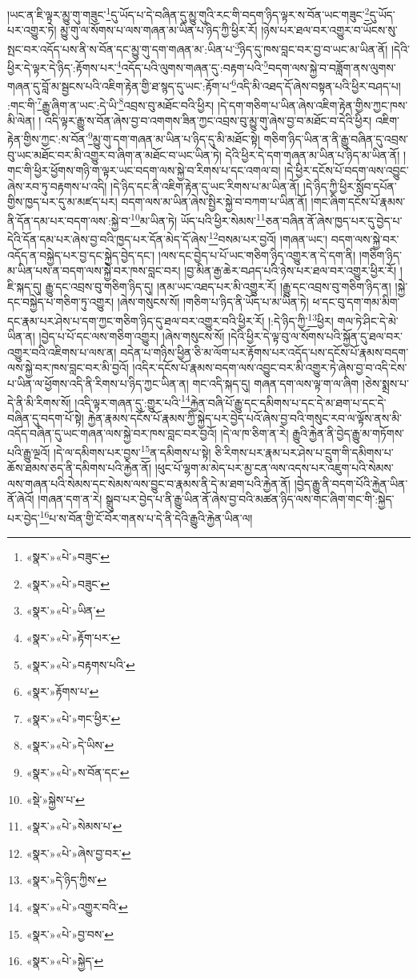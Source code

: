 །ཡང་ན་ཇི་ལྟར་མྱུ་གུ་གཟུང་\footnote{«སྣར་»«པེ་»བཟུང་}དུ་ཡོད་པ་དེ་བཞིན་དུ་མྱུ་གུའི་རང་གི་བདག་ཉིད་ལྟར་ས་བོན་ཡང་གཟུང་\footnote{«སྣར་»«པེ་»བཟུང་}དུ་ཡོད་པར་འགྱུར་ཏེ། མྱུ་གུ་ལ་སོགས་པ་ལས་གཞན་མ་ཡིན་པ་ཉིད་ཀྱི་ཕྱིར་རོ། །ཉེས་པར་ཐལ་བར་འགྱུར་བ་ཡོངས་སུ་སྤང་བར་འདོད་པས་ནི་ས་བོན་དང་མྱུ་གུ་དག་གཞན་མ་:ཡིན་པ་\footnote{«སྣར་»«པེ་»ཡིན་}ཉིད་དུ་ཁས་བླང་བར་བྱ་བ་ཡང་མ་ཡིན་ནོ། །དེའི་ཕྱིར་དེ་ལྟར་དེ་ཉིད་:རྟོགས་པར་\footnote{«སྣར་»«པེ་»རྟོག་པར་}འདོད་པའི་ལུགས་གཞན་དུ་:བརྟག་པའི་\footnote{«སྣར་»«པེ་»བརྟགས་པའི་}བདག་ལས་སྐྱེ་བ་བཟློག་ནས་ལུགས་གཞན་དུ་བློ་མ་སྦྱངས་པའི་འཇིག་རྟེན་གྱི་ཐ་སྙད་དུ་ཡང་:རྟོག་པ་\footnote{«སྣར་»རྟོགས་པ་}འདི་མི་འཐད་དོ་ཞེས་བསྟན་པའི་ཕྱིར་བཤད་པ། :གང་གི་\footnote{«སྣར་»«པེ་»གང་ཕྱིར་}རྒྱུ་ཞིག་ན་ཡང་:དེ་ཡི་\footnote{«སྣར་»«པེ་»དེ་ཡིས་}འབྲས་བུ་མཐོང་བའི་ཕྱིར། །དེ་དག་གཅིག་པ་ཡིན་ཞེས་འཇིག་རྟེན་གྱིས་ཀྱང་ཁས་མི་ལེན། །
འདི་ལྟར་རྒྱུ་ས་བོན་ཞེས་བྱ་བ་འགགས་ཟིན་ཀྱང་འབྲས་བུ་མྱུ་གུ་ཞེས་བྱ་བ་མཐོང་བ་དེའི་ཕྱིར། འཇིག་རྟེན་གྱིས་ཀྱང་:ས་བོན་\footnote{«སྣར་»«པེ་»ས་བོན་དང་}མྱུ་གུ་དག་གཞན་མ་ཡིན་པ་ཉིད་དུ་མི་མཐོང་སྟེ། གཅིག་ཉིད་ཡིན་ན་ནི་རྒྱུ་བཞིན་དུ་འབྲས་བུ་ཡང་མཐོང་བར་མི་འགྱུར་བ་ཞིག་ན་མཐོང་བ་ཡང་ཡིན་ཏེ། དེའི་ཕྱིར་དེ་དག་གཞན་མ་ཡིན་པ་ཉིད་མ་ཡིན་ནོ། །གང་གི་ཕྱིར་ཕྱོགས་གཉི་ག་ལྟར་ཡང་བདག་ལས་སྐྱེ་བ་རིགས་པ་དང་འགལ་བ། །དེ་ཕྱིར་དངོས་པོ་བདག་ལས་འབྱུང་ཞེས་རབ་ཏུ་བརྟགས་པ་འདི། །དེ་ཉིད་དང་ནི་འཇིག་རྟེན་དུ་ཡང་རིགས་པ་མ་ཡིན་ནོ། །དེ་ཉིད་ཀྱི་ཕྱིར་སློབ་དཔོན་གྱིས་ཁྱད་པར་དུ་མ་མཛད་པར། བདག་ལས་མ་ཡིན་ཞེས་སྤྱིར་སྐྱེ་བ་བཀག་པ་ཡིན་ནོ། །གང་ཞིག་དངོས་པོ་རྣམས་ནི་དོན་དམ་པར་བདག་ལས་:སྐྱེ་བ་\footnote{«སྡེ་»སྐྱེས་པ་}མ་ཡིན་ཏེ། ཡོད་པའི་ཕྱིར་སེམས་\footnote{«སྣར་»«པེ་»སེམས་པ་}ཅན་བཞིན་ནོ་ཞེས་ཁྱད་པར་དུ་བྱེད་པ་དེའི་དོན་དམ་པར་ཞེས་བྱ་བའི་ཁྱད་པར་དོན་མེད་དོ་ཞེས་\footnote{«སྣར་»«པེ་»ཞེས་བྱ་བར་}བསམ་པར་བྱའོ། །གཞན་ཡང་། བདག་ལས་སྐྱེ་བར་འདོད་ན་བསྐྱེད་པར་བྱ་དང་སྐྱེད་བྱེད་དང་། །ལས་དང་བྱེད་པ་པོ་ཡང་གཅིག་ཉིད་འགྱུར་ན་དེ་དག་ནི། །གཅིག་ཉིད་མ་ཡིན་པས་ན་བདག་ལས་སྐྱེ་བར་ཁས་བླང་བར། །བྱ་མིན་རྒྱ་ཆེར་བཤད་པའི་ཉེས་པར་ཐལ་བར་འགྱུར་ཕྱིར་རོ། །ཇི་སྐད་དུ། རྒྱུ་དང་འབྲས་བུ་གཅིག་ཉིད་དུ། །ནམ་ཡང་འཐད་པར་མི་འགྱུར་རོ། །རྒྱུ་དང་འབྲས་བུ་གཅིག་ཉིད་ན། །སྐྱེ་དང་བསྐྱེད་པ་གཅིག་ཏུ་འགྱུར། །ཞེས་གསུངས་སོ། །གཅིག་པ་ཉིད་ནི་ཡོད་པ་མ་ཡིན་ཏེ། ཕ་དང་བུ་དག་གམ་མིག་དང་རྣམ་པར་ཤེས་པ་དག་ཀྱང་གཅིག་ཉིད་དུ་ཐལ་བར་འགྱུར་བའི་ཕྱིར་རོ། །:དེ་ཉིད་ཀྱི་\footnote{«སྣར་»དེ་ཉིད་ཀྱིས་}ཕྱིར། གལ་ཏེ་ཤིང་དེ་མེ་ཡིན་ན། །བྱེད་པ་པོ་དང་ལས་གཅིག་འགྱུར། །ཞེས་གསུངས་སོ། །དེའི་ཕྱིར་དེ་ལྟ་བུ་ལ་སོགས་པའི་སྐྱོན་དུ་ཐལ་བར་འགྱུར་བའི་འཇིགས་པ་ལས་ན། བདེན་པ་གཉིས་ཕྱིན་ཅི་མ་ལོག་པར་རྟོགས་པར་འདོད་པས་དངོས་པོ་རྣམས་བདག་ལས་སྐྱེ་བར་ཁས་བླང་བར་མི་བྱའོ། །འདིར་དངོས་པོ་རྣམས་བདག་ལས་འབྱུང་བར་མི་འགྱུར་ཏེ་ཞེས་བྱ་བ་འདི་ངེས་པ་ཡིན་ལ་ཕྱོགས་འདི་ནི་རིགས་པ་ཉིད་ཀྱང་ཡིན་ན། གང་འདི་སྐད་དུ། གཞན་དག་ལས་ལྟ་ག་ལ་ཞིག །ཅེས་སྨྲས་པ་དེ་ནི་མི་རིགས་སོ། །འདི་ལྟར་གཞན་དུ་:གྱུར་པའི་\footnote{«སྣར་»«པེ་»འགྱུར་བའི་}རྐྱེན་བཞི་པོ་རྒྱུ་དང་དམིགས་པ་དང་དེ་མ་ཐག་པ་དང་དེ་བཞིན་དུ་བདག་པོ་སྟེ། རྐྱེན་རྣམས་དངོས་པོ་རྣམས་ཀྱི་སྐྱེད་པར་བྱེད་པའོ་ཞེས་བྱ་བའི་གསུང་རབ་ལ་ལྟོས་ནས་མི་འདོད་བཞིན་དུ་ཡང་གཞན་ལས་སྐྱེ་བར་ཁས་བླང་བར་བྱའོ། །དེ་ལ་ཁ་ཅིག་ན་རེ། རྒྱུའི་རྐྱེན་ནི་བྱེད་རྒྱུ་མ་གཏོགས་པའི་རྒྱུ་ལྔའོ། །དེ་ལ་དམིགས་པར་བྱས་\footnote{«སྣར་»«པེ་»བྱ་བས་}ན་དམིགས་པ་སྟེ། ཅི་རིགས་པར་རྣམ་པར་ཤེས་པ་དྲུག་གི་དམིགས་པ་ཆོས་ཐམས་ཅད་ནི་དམིགས་པའི་རྐྱེན་ནོ། །ཕུང་པོ་ལྷག་མ་མེད་པར་མྱ་ངན་ལས་འདས་པར་འཇུག་པའི་སེམས་ལས་གཞན་པའི་སེམས་དང་སེམས་ལས་བྱུང་བ་རྣམས་ནི་དེ་མ་ཐག་པའི་རྐྱེན་ནོ། །བྱེད་རྒྱུ་ནི་བདག་པོའི་རྐྱེན་ཡིན་ནོ་ཞེའོ། །གཞན་དག་ན་རེ། སྒྲུབ་པར་བྱེད་པ་ནི་རྒྱུ་ཡིན་ནོ་ཞེས་བྱ་བའི་མཚན་ཉིད་ལས་གང་ཞིག་གང་གི་:སྐྱེད་པར་བྱེད་\footnote{«སྣར་»«པེ་»སྐྱེད་}པ་ས་བོན་གྱི་ངོ་བོར་གནས་པ་དེ་ནི་དེའི་རྒྱུའི་རྐྱེན་ཡིན་ལ། 